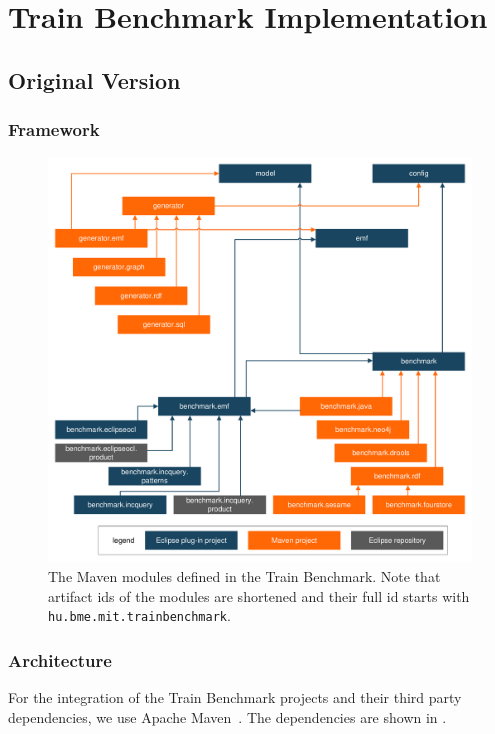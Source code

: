 \chapter{Train Benchmark Implementation}

\section{Original Version}

\subsection{Framework}

\begin{figure}[!Htb]
	\centering
	\includegraphics[width=\textwidth]{figures/trainbenchmark-modules}
	\caption{The Maven modules defined in the Train Benchmark. Note that artifact ids of the modules are shortened and their full id starts with \texttt{hu.bme.mit.trainbenchmark}.}
	\label{fig:trainbenchmark-modules}
\end{figure}

\subsection{Architecture}

For the integration of the Train Benchmark projects and their third party dependencies, we use Apache Maven~\cite{Maven}. The dependencies are shown in .

